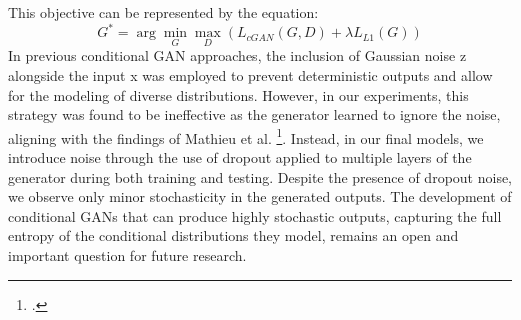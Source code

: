 This objective can be represented by the equation:
\begin{equation}
    G^* = \arg \min_G \max_D \left( L_{cGAN}(G, D) + \lambda L_{L1}(G) \right)
\end{equation}
In previous conditional GAN approaches, the inclusion of Gaussian noise z alongside the input x was employed to prevent deterministic outputs and allow for the modeling of diverse distributions. 
However, in our experiments, this strategy was found to be ineffective as the generator learned to ignore the noise, aligning with the findings of Mathieu et al. \footcite{paper:MMathieuICLR16}. 
Instead, in our final models, we introduce noise through the use of dropout applied to multiple layers of the generator during both training and testing. 
Despite the presence of dropout noise, we observe only minor stochasticity in the generated outputs. 
The development of conditional GANs that can produce highly stochastic outputs, capturing the full entropy of the conditional distributions they model, remains an open and important question for future research.
